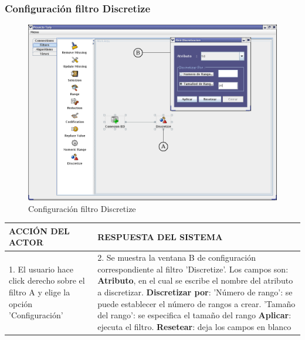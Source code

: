 \subsubsection{Configuraci\'on filtro Discretize}
\begin{figure}[ht]
\centering
\includegraphics[width=1\textwidth]{images/fi9.png}
\caption{Configuraci\'on filtro Discretize}
\end{figure}
\begin{center}
\begin{tabular}{|p{60mm}|p{60mm}|} \hline
ACCI\'ON DEL ACTOR & RESPUESTA DEL SISTEMA \\ \hline
1. El usuario hace click derecho sobre el filtro A y elige la opci\'on 'Configuraci\'on'& 2. Se muestra la ventana B de configuraci\'on correspondiente al filtro 'Discretize'. Los campos son: \textbf{Atributo}, en el cual se escribe el nombre del atributo a discretizar. \textbf{Discretizar por}: 'N\'umero de rango': se puede establecer el n\'umero de rangos a crear. 'Tama\~no del rango': se especifica el tama\~no del rango \textbf{Aplicar}: ejecuta el filtro. \textbf{Resetear}: deja los campos en blanco  \\ \hline
\end{tabular}
\end{center}

\newpage
